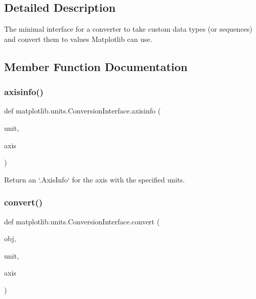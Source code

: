 \subsection{Detailed Description}
\begin{DoxyVerb}The minimal interface for a converter to take custom data types (or
sequences) and convert them to values Matplotlib can use.
\end{DoxyVerb}
 

\subsection{Member Function Documentation}
\mbox{\label{classmatplotlib_1_1units_1_1ConversionInterface_a9b4018c7837e3646e722747d8853b200}} 
\subsubsection{\texorpdfstring{axisinfo()}{axisinfo()}}
{\footnotesize\ttfamily def matplotlib.\+units.\+Conversion\+Interface.\+axisinfo (\begin{DoxyParamCaption}\item[{}]{unit,  }\item[{}]{axis }\end{DoxyParamCaption})\hspace{0.3cm}{\ttfamily [static]}}

\begin{DoxyVerb}Return an `.AxisInfo` for the axis with the specified units.\end{DoxyVerb}
 \mbox{\label{classmatplotlib_1_1units_1_1ConversionInterface_ad7bfcbda9759240f1a1bca360c64ae18}} 
\subsubsection{\texorpdfstring{convert()}{convert()}}
{\footnotesize\ttfamily def matplotlib.\+units.\+Conversion\+Interface.\+convert (\begin{DoxyParamCaption}\item[{}]{obj,  }\item[{}]{unit,  }\item[{}]{axis }\end{DoxyParamCaption})\hspace{0.3cm}{\ttfamily [static]}}

